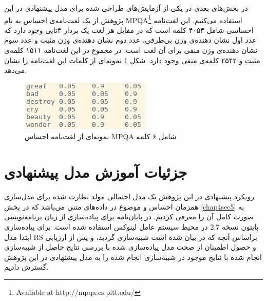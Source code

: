 در بخش‌های بعدی در یکی‌ از آزمایش‌های طراحی شده برای مدل پیشنهادی در این پژوهش از یک لغت‌نامه‌ی احساس به نام
MPQA\footnote{Available at http://mpqa.cs.pitt.edu/}
استفاده می‌‌کنیم. این لغت‌نامه احساسی‌ شامل ۴۰۵۳ کلمه است که در مقابل هر لغت یک بردار ۳تایی‌ وجود دارد که عدد اول نشان دهنده‌ی وزن بی‌طرفی، عدد دوم نشان دهنده‌ی وزن مثبت و عدد سوم نشان دهنده‌ی وزن منفی‌ برای آن لغت است. در مجموع در این لغت‌نامه ۱۵۱۱ کلمه‌ی مثبت و ۲۵۴۲ کلمه‌ی منفی‌ وجود دارد. شکل
\ref{chap5-fig2}
نمونه‌ای از کلمات این لغت‌نامه را نشان می‌‌دهد.
\begin{figure}[!b]
	\centering
	\includegraphics[scale=0.7]{chap5-img/lex-example}
	\caption{نمونه‌ای از لغت‌نامه احساس MPQA شامل ۶ کلمه}
	\label{chap5-fig2}
\end{figure}

\section{جزئیات آموزش مدل پیشنهادی}
\label{chap5sec6}
رويکرد پيشنهادی در اين پژوهش يک مدل احتمالی مولد نظارت شده برای مدل‌سازی همزمان احساس و موضوع در داده‌های متنی می‌باشد که در بخش
\ref{chap4sec5}
به صورت کامل آن را معرفی کردیم. در پایان‌‌نامه برای پياده‌سازی از زبان برنامه‌نويسی پایتون نسخه 2.7 در محيط سيستم عامل لينوکس استفاده شده است. برای پیاده‌سازی ابتدا مدل 
RS
براساس آنچه که در 
\cite{hinton2009replicated}
بيان شده است شبيه‌سازی گرديد، و پس از ارزیابی  و حصول اطمینان از صحت مدل پياده‌سازی شده با بررسی نتايج حاصل از شبيه‌سازی انجام شده با نتايج موجود در 
\cite{hinton2009replicated}
شبيه‌سازی انجام شده را به مدل پيشنهادی در اين پژوهش گسترش داديم.


